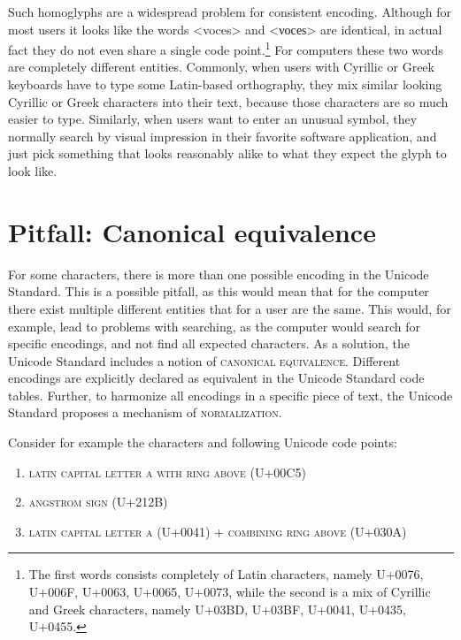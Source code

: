 Such homoglyphs are a widespread problem for consistent encoding. Although for
most users it looks like the words <voces> and <νοсеѕ> are identical, in actual
fact they do not even share a single code point.\footnote{The first words
consists completely of Latin characters, namely U+0076, U+006F, U+0063, U+0065,
U+0073, while the second is a mix of Cyrillic and Greek characters, namely
U+03BD, U+03BF, U+0041, U+0435, U+0455.} For computers these two words are
completely different entities. Commonly, when users with Cyrillic or Greek
keyboards have to type some Latin-based orthography, they mix similar looking
Cyrillic or Greek characters into their text, because those characters are so
much easier to type. Similarly, when users want to enter an unusual symbol, they
normally search by visual impression in their favorite software application, and
just pick something that looks reasonably alike to what they expect the glyph to
look like.

\section{Pitfall: Canonical equivalence} \label{pitfall-canonical-equivalence}

For some characters, there is more than one possible encoding in the Unicode
Standard. This is a possible pitfall, as this would mean that for the computer
there exist multiple different entities that for a user are the same. This
would, for example, lead to problems with searching, as the computer would
search for specific encodings, and not find all expected characters. As a
solution, the Unicode Standard includes a notion of \textsc{canonical
equivalence}. Different encodings are explicitly declared as equivalent in the
Unicode Standard code tables. Further, to harmonize all encodings in a specific
piece of text, the Unicode Standard proposes a mechanism of
\textsc{normalization}.

Consider for example the characters and following Unicode code points:
\begin{enumerate}
	\def\labelenumi{\arabic{enumi}.} \item \textsc{latin capital letter a
	with ring above} (U+00C5) \item \textsc{angstrom sign} (U+212B) \item
	\textsc{latin capital letter a} (U+0041) + \textsc{combining ring above}
	(U+030A)
\end{enumerate}

